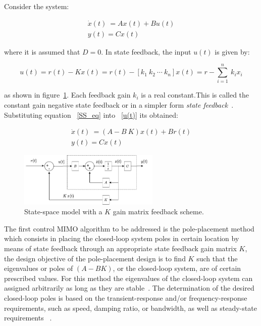 Consider the system:

\begin{align} 
	\dot{x}(t)~=Ax(t)+Bu(t) 	\label{SS_eq}\\
y(t)=Cx(t) \nonumber
\end{align}

where it is assumed that $D=0$. In state feedback, the input $u(t)$ is given by:

\begin{equation}
	u(t)=r(t)-Kx(t) = r(t)-[k_1~ k_2~\cdots ~k_n] x(t)=r-\sum_{i=1}^{n}~k_ix_i
	\label{u(t)}
\end{equation}

as shown in figure~\ref{SS_schm}. Each feedback gain $k_i$ is a real constant.This is called the constant gain negative state feedback or in a simpler form \textit{state feedback}~\cite{Chen1999}. Substituting equation ~\ref{SS_eq} into ~\ref{u(t)} its obtained:

\begin{align} 
\dot{x}(t)~=(A-B~K)x(t)+Br(t) \label{SS_eq_feed} \\
y(t)=Cx(t) \nonumber
\end{align}



\begin{figure}[h]
	\centering
	\includegraphics[width=0.6\textwidth]{Chp2/SS_scheme.png}
	\caption{  State-space model with a $K$ gain matrix feedback scheme.\label{SS_schm}}
\end{figure}


The first control MIMO algorithm to be addressed  is the pole-placement method which consists in placing the closed-loop system poles in certain location by means of state feedback through an appropriate state feedback gain matrix $K$, the design objective of the pole-placement design is to find  $K$ such that the eigenvalues or poles of $(A-BK)$, or the closed-loop system, are of certain prescribed values. For this method the eigenvalues of the closed-loop system can assigned arbitrarily  as long as they are stable~\cite[Chapter~10]{Golnaraghi2010}. The  determination of the desired closed-loop poles is based on the transient-response and/or frequency-response requirements, such as speed, damping ratio, or bandwidth, as well as steady-state requirements ~\cite[Chapter~10]{Ogata2009}.
\smallskip

